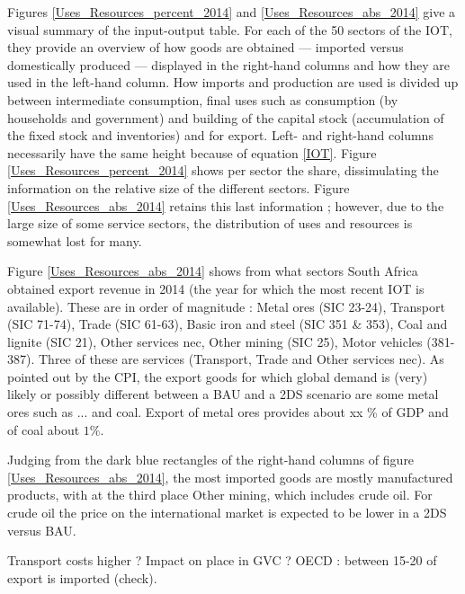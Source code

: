 \documentclass[12pt,english]{article}
\newcommand\lies[2][]{\todo[color=orange!50,#1]{ldf: #2}}
\newcommand\li[1]{\lies[inline]{#1}}
\begin{document}
Figures \ref{Uses_Resources_percent_2014} and \ref{Uses_Resources_abs_2014} give a visual summary of the input-output table. For each of the 50 sectors of the IOT, they provide an overview of how goods are obtained --- imported versus domestically produced --- displayed in the right-hand columns and how they are used in the left-hand column. How imports and production are used is divided up between intermediate consumption, final uses such as consumption (by households and government) and building of the capital stock (accumulation of the fixed stock and inventories) and for export. Left- and right-hand columns necessarily have the same height because of equation \ref{IOT}. Figure \ref{Uses_Resources_percent_2014} shows per sector the share, dissimulating the information on the relative size of the different sectors. Figure \ref{Uses_Resources_abs_2014} retains this last information ; however, due to the large size of some service sectors, the distribution of uses and resources is somewhat lost for many.  

Figure \ref{Uses_Resources_abs_2014} shows from what sectors South Africa obtained export revenue in 2014 (the year for which the most recent IOT is available). These are in order of magnitude : Metal ores (SIC 23-24), Transport (SIC 71-74), Trade (SIC 61-63), Basic iron and steel (SIC 351 \& 353), Coal and lignite (SIC 21), Other services nec, Other mining (SIC 25), Motor vehicles (381-387). Three of these are services (Transport, Trade and Other services nec). %
As pointed out by the CPI, the export goods for which global demand is (very) likely or possibly different between a BAU and a 2DS scenario are some metal ores such as ... and coal. Export of metal ores provides about xx \% of GDP and of coal about $1\%$\li{small tables}.

Judging from the dark blue rectangles of the right-hand columns of figure \ref{Uses_Resources_abs_2014}, the most imported goods are mostly manufactured products, with at the third place Other mining, which includes crude oil. For crude oil the price on the international market is expected to be lower in a 2DS versus BAU. 

Transport costs higher ? Impact on place in GVC ? OECD : between 15-20 of export is imported (check).
\end{document}
